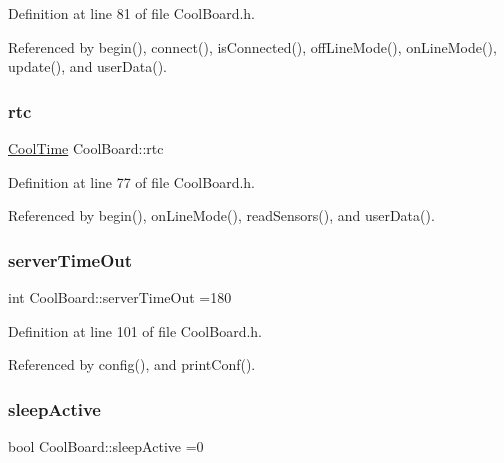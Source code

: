 Definition at line 81 of file Cool\+Board.\+h.



Referenced by begin(), connect(), is\+Connected(), off\+Line\+Mode(), on\+Line\+Mode(), update(), and user\+Data().

\mbox{\label{classCoolBoard_a50d2a6716879d64a85f3c6b44ad63275}} 
\subsubsection{\texorpdfstring{rtc}{rtc}}
{\footnotesize\ttfamily \hyperlink{classCoolTime}{Cool\+Time} Cool\+Board\+::rtc\hspace{0.3cm}{\ttfamily [private]}}



Definition at line 77 of file Cool\+Board.\+h.



Referenced by begin(), on\+Line\+Mode(), read\+Sensors(), and user\+Data().

\mbox{\label{classCoolBoard_a7a8d8d3d316220cdd049cd63c1aa8fe6}} 
\subsubsection{\texorpdfstring{server\+Time\+Out}{serverTimeOut}}
{\footnotesize\ttfamily int Cool\+Board\+::server\+Time\+Out =180\hspace{0.3cm}{\ttfamily [private]}}



Definition at line 101 of file Cool\+Board.\+h.



Referenced by config(), and print\+Conf().

\mbox{\label{classCoolBoard_a0a51b2287139f66c738101fb53139230}} 
\subsubsection{\texorpdfstring{sleep\+Active}{sleepActive}}
{\footnotesize\ttfamily bool Cool\+Board\+::sleep\+Active =0\hspace{0.3cm}{\ttfamily [private]}}



